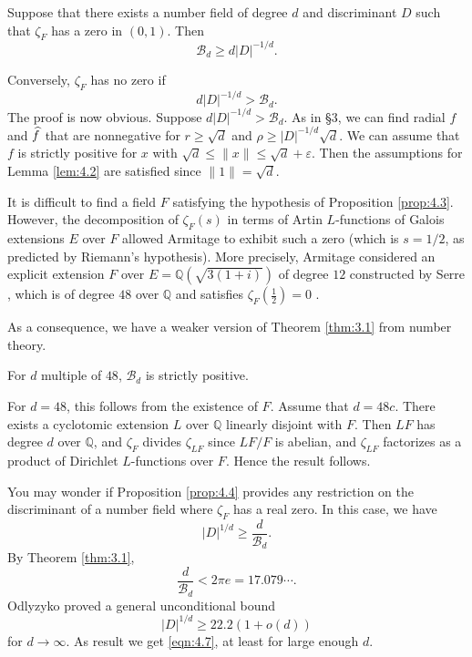\begin{proposition}
\label{prop:4.3}
Suppose that there exists a number field of degree $d$ and discriminant $D$ such that $\zeta_F$ has a zero in $(0, 1)$.
Then
\[
    \mathcal{B}_{d} \geq d |D|^{-1/d}.
\]
\end{proposition}

Conversely, $\zeta_F$ has no zero if
\[
    d |D|^{-1/d} > \mathcal{B}_{d}.
\]
The proof is now obvious.
Suppose $d |D|^{-1/d} > \mathcal{B}_{d}$.
As in \S 3, we can find radial $f$ and $\widehat{f}$ that are nonnegative for $r \geq \sqrt{d}$ and $\rho \geq |D|^{-1/d} \sqrt{d}$.
We can assume that $f$ is strictly positive for $x$ with $\sqrt{d} \leq \|x\| \leq \sqrt{d} + \varepsilon$.
Then the assumptions for Lemma \ref{lem:4.2} are satisfied since $\|1\| = \sqrt{d}$.

It is difficult to find a field $F$ satisfying the hypothesis of Proposition \ref{prop:4.3}.
However, the decomposition of $\zeta_F(s)$ in terms of Artin $L$-functions of Galois extensions $E$ over $F$ allowed Armitage to exhibit such a zero (which is $s = 1/2$, as predicted by Riemann's hypothesis).
More precisely, Armitage considered an explicit extension $F$ over $E = \mathbb{Q}(\sqrt{3(1+i)})$ of degree $12$ constructed by Serre \cite{serre1971conducteurs}, which is of degree $48$ over $\mathbb{Q}$ and satisfies $\zeta_F\left(\frac{1}{2}\right) = 0$ \cite[\S 4]{armitage1971zeta}.

As a consequence, we have a weaker version of Theorem \ref{thm:3.1} from number theory.

\begin{proposition}
\label{prop:4.4}
For $d$ multiple of $48$, $\mathcal{B}_{d}$ is strictly positive.
\end{proposition}

For $d = 48$, this follows from the existence of $F$.
Assume that $d = 48c$.
There exists a cyclotomic extension $L$ over $\mathbb{Q}$ linearly disjoint with $F$.
Then $LF$ has degree $d$ over $\mathbb{Q}$, and $\zeta_F$ divides $\zeta_{LF}$ since $LF/F$ is abelian, and $\zeta_{LF}$ factorizes as a product of Dirichlet $L$-functions over $F$.
Hence the result follows.

You may wonder if Proposition \ref{prop:4.4} provides any restriction on the discriminant of a number field where $\zeta_F$ has a real zero.
In this case, we have
\begin{equation}
    \label{eqn:4.7}
    |D|^{1/d} \geq \frac{d}{\mathcal{B}_d}.
\end{equation}
By Theorem \ref{thm:3.1},
\[
    \frac{d}{\mathcal{B}_d} < 2 \pi e = 17.079\cdots.
\]
Odlyzyko \cite{odlyzko1977lower} proved a general unconditional bound 
\[
    |D|^{1/d} \geq 22.2(1 + o(d))
\]
for $d \to \infty$.
As result we get \eqref{eqn:4.7}, at least for large enough $d$.

